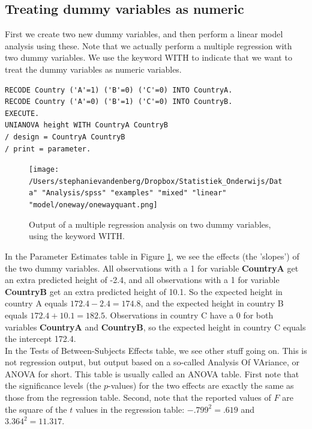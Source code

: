 \documentclass[]{book}\usepackage[]{graphicx}\usepackage[]{color}
\begin{document}
\subsection{Treating dummy variables as numeric}


First we create two new dummy variables, and then perform a linear model analysis using these. Note that we actually perform a multiple regression with two dummy variables. We use the keyword WITH to indicate that we want to treat the dummy variables as numeric variables.


\begin{verbatim}
RECODE Country ('A'=1) ('B'=0) ('C'=0) INTO CountryA.
RECODE Country ('A'=0) ('B'=1) ('C'=0) INTO CountryB.
EXECUTE.
UNIANOVA height WITH CountryA CountryB
/ design = CountryA CountryB
/ print = parameter.
\end{verbatim}


\begin{figure}[h]
    \begin{center}
       \texttt{[image: /Users/stephanievandenberg/Dropbox/Statistiek\_Onderwijs/Data" "Analysis/spss" "examples" "mixed" "linear" "model/oneway/onewayquant.png]}
    \end{center}
    \caption{Output of a multiple regression analysis on two dummy variables, using the keyword WITH.}
    \label{fig:dummy_21}
\end{figure}


In the Parameter Estimates table in Figure \ref{fig:dummy_21}, we see the effects (the 'slopes') of the two dummy variables. All observations with a 1 for variable \textbf{CountryA} get an extra predicted height of -2.4, and all observations with a 1 for variable \textbf{CountryB} get an extra predicted height of 10.1. So the expected height in country A equals $172.4 - 2.4 = 174.8$, and the expected height in country B equals $172.4+10.1=182.5 $. Observations in country C have a 0 for both variables \textbf{CountryA} and \textbf{CountryB}, so the expected height in country C equals the intercept 172.4.\\

In the Tests of Between-Subjects Effects table, we see other stuff going on. This is not regression output, but output based on a so-called Analysis Of VAriance, or ANOVA for short. This table is usually called an ANOVA table. First note that the significance levels (the $p$-values) for the two effects are exactly the same as those from the regression table. Second, note that the reported values of $F$ are the square of the $t$ values in the regression table: $-.799^2=.619$ and $3.364^2=11.317$. \\
\end{document}
